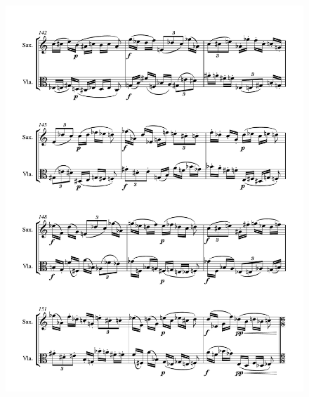 \begin{figure}[htbp]
    \centering
	\includegraphics[width=6.5in]{figures/Sax_Viola_13.pdf}
\end{figure}

